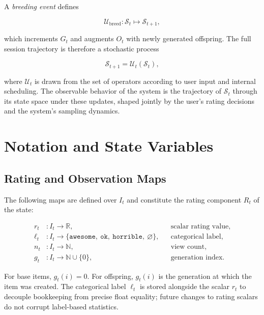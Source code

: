 \documentclass[12pt, a4paper]{article}
\theoremstyle{definition}
\begin{document}
A \textit{breeding event} defines

\begin{equation}
\mathcal{U}_{\text{breed}} : \mathcal{S}_t \mapsto \mathcal{S}_{t+1},
\end{equation}

which increments $G_t$ and augments $O_t$ with newly generated offspring. The full session trajectory is therefore a stochastic process

\begin{equation}
\mathcal{S}_{t+1} = \mathcal{U}_t(\mathcal{S}_t),
\end{equation}

where $\mathcal{U}_t$ is drawn from the set of operators according to user input and internal scheduling. The observable behavior of the system is the trajectory of $\mathcal{S}_t$ through its state space under these updates, shaped jointly by the user's rating decisions and the system's sampling dynamics.

\section{Notation and State Variables}

\subsection{Rating and Observation Maps}

The following maps are defined over $I_t$ and constitute the rating component $R_t$ of the state:

\begin{align}
r_t &: I_t \to \mathbb{R}, & &\text{scalar rating value,} \\
\ell_t &: I_t \to \{\texttt{awesome},\ \texttt{ok},\ \texttt{horrible},\ \varnothing\}, & &\text{categorical label,} \\
n_t &: I_t \to \mathbb{N}, & &\text{view count,} \\
g_t &: I_t \to \mathbb{N} \cup \{0\}, & &\text{generation index.}
\end{align}

For base items, $g_t(i) = 0$. For offspring, $g_t(i)$ is the generation at which the item was created. The categorical label $\ell_t$ is stored alongside the scalar $r_t$ to decouple bookkeeping from precise float equality; future changes to rating scalars do not corrupt label-based statistics.
\end{document}

